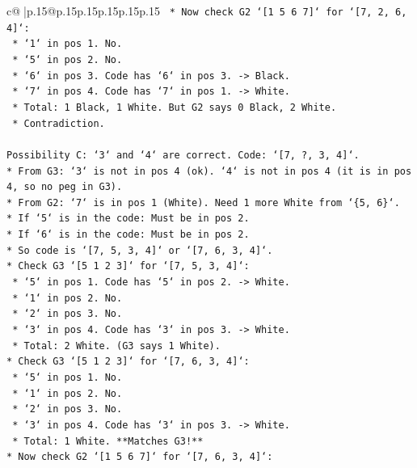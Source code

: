 \documentclass{article}
\begin{document}
{\begin{supertabular}{c@{$\;$}|p{.15\linewidth}@{}p{.15\linewidth}p{.15\linewidth}p{.15\linewidth}p{.15\linewidth}p{.15\linewidth}}
{{{\texttt{        *   Now check G2 `{[}1 5 6 7{]}` for `{[}7, 2, 6, 4{]}`:} \\
\texttt{            *   `1` in pos 1. No.} \\
\texttt{            *   `5` in pos 2. No.} \\
\texttt{            *   `6` in pos 3. Code has `6` in pos 3. {-}> Black.} \\
\texttt{            *   `7` in pos 4. Code has `7` in pos 1. {-}> White.} \\
\texttt{            *   Total: 1 Black, 1 White. But G2 says 0 Black, 2 White.} \\
\texttt{            *   Contradiction.} \\
\\ 
\texttt{Possibility C: `3` and `4` are correct. Code: `{[}7, ?, 3, 4{]}`.} \\
\texttt{*   From G3: `3` is not in pos 4 (ok). `4` is not in pos 4 (it is in pos 4, so no peg in G3).} \\
\texttt{*   From G2: `7` is in pos 1 (White). Need 1 more White from `\{5, 6\}`.} \\
\texttt{*   If `5` is in the code: Must be in pos 2.} \\
\texttt{*   If `6` is in the code: Must be in pos 2.} \\
\texttt{*   So code is `{[}7, 5, 3, 4{]}` or `{[}7, 6, 3, 4{]}`.} \\
\texttt{*   Check G3 `{[}5 1 2 3{]}` for `{[}7, 5, 3, 4{]}`:} \\
\texttt{    *   `5` in pos 1. Code has `5` in pos 2. {-}> White.} \\
\texttt{    *   `1` in pos 2. No.} \\
\texttt{    *   `2` in pos 3. No.} \\
\texttt{    *   `3` in pos 4. Code has `3` in pos 3. {-}> White.} \\
\texttt{    *   Total: 2 White. (G3 says 1 White).} \\
\texttt{*   Check G3 `{[}5 1 2 3{]}` for `{[}7, 6, 3, 4{]}`:} \\
\texttt{    *   `5` in pos 1. No.} \\
\texttt{    *   `1` in pos 2. No.} \\
\texttt{    *   `2` in pos 3. No.} \\
\texttt{    *   `3` in pos 4. Code has `3` in pos 3. {-}> White.} \\
\texttt{    *   Total: 1 White. **Matches G3!**} \\
\texttt{*   Now check G2 `{[}1 5 6 7{]}` for `{[}7, 6, 3, 4{]}`:} \\
}}}
\end{supertabular}}
\end{document}
